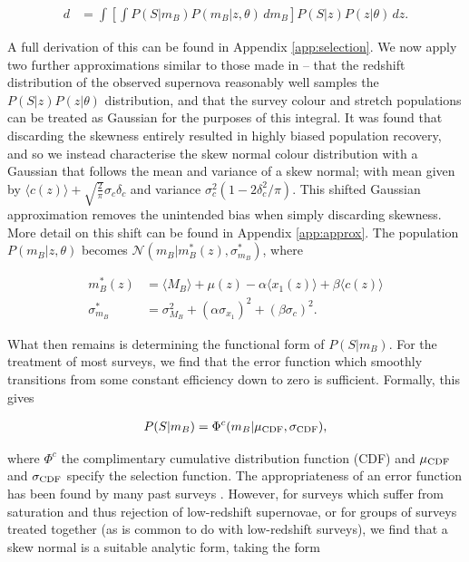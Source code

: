\documentclass[a4paper,fleqn,usenatbib]{mnras}
\newcommand{\rubin}{\citetalias{Rubin2015}}
\begin{document}
\begin{align}
d &= \int  \left[ \int P(S|m_B) P(m_B | z, \theta)\, d m_B \right] P(S|z) P(z|\theta)\, dz. \label{eq:w1}
\end{align}

A full derivation of this can be found in Appendix \ref{app:selection}. We now apply two further approximations similar to those made in {\rubin} -- that the redshift distribution of the observed supernova reasonably well samples the $P(S|z)P(z|\theta)$ distribution, and that the survey colour and stretch populations can be treated as Gaussian for the purposes of this integral. It was found that discarding the skewness entirely resulted in highly biased population recovery, and so we instead characterise the skew normal colour distribution with a Gaussian that follows the mean and variance of a skew normal; with mean given by $\langle c(z) \rangle + \sqrt{\frac{2}{\pi}} \sigma_c \delta_c$ and variance $\sigma_c^2(1 - 2\delta_c^2/\pi)$. This shifted Gaussian approximation removes the unintended bias when simply discarding skewness. More detail on this shift can be found in Appendix \ref{app:approx}. The population $P(m_B | z, \theta)$ becomes $\mathcal{N}(m_B|m_B^*(z), \sigma^*_{m_B})$, where

\begin{align}
m_B^*(z) &= \langle M_B \rangle + \mu(z) - \alpha \langle x_1(z) \rangle + \beta \langle c(z) \rangle \\
\sigma^*_{m_B} &= \sigma_{M_B}^2 + (\alpha \sigma_{x_1})^2 + (\beta \sigma_c)^2.
\end{align}

What then remains is determining the functional form of $P(S|m_B)$. For the treatment of most surveys, we find that the error function which smoothly transitions from some constant efficiency down to zero is sufficient. Formally, this gives

\begin{align}
P(S|m_B) = \Phi^c(m_B | \mu_{\rm CDF}, \sigma_{\rm CDF}),
\end{align}

where $\Phi^c$ the complimentary cumulative distribution function (CDF) and $\mu_{\rm CDF}$ and $\sigma_{\rm CDF}$ specify the selection function. The appropriateness of an error function has been found by many past surveys \citep{Dilday2008, Barbary2010, Perrett2012, Graur2013, Rodney2014}. However, for surveys which suffer from saturation and thus rejection of low-redshift supernovae, or for groups of surveys treated together (as is common to do with low-redshift surveys), we find that a skew normal is a suitable analytic form, taking the form
\end{document}
